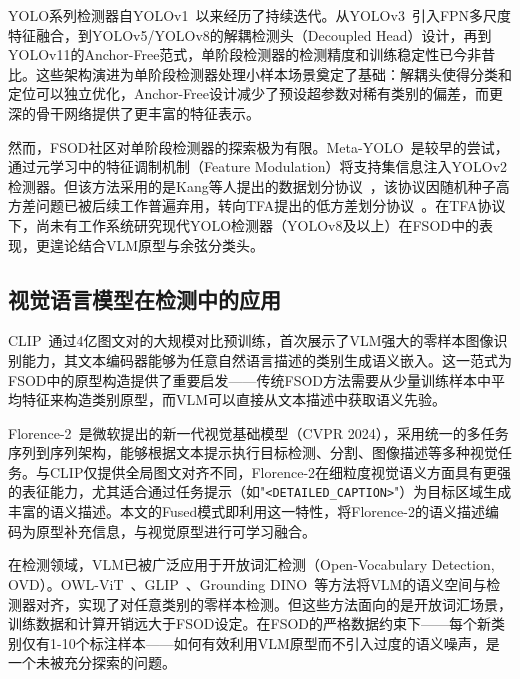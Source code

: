 \documentclass[zihao=5,a4paper,twocolumn]{ctexart}
\begin{document}
YOLO系列检测器自YOLOv1~\cite{redmon2016yolo}以来经历了持续迭代。从YOLOv3~\cite{redmon2018yolov3}引入FPN多尺度特征融合，到YOLOv5/YOLOv8的解耦检测头（Decoupled Head）设计，再到YOLOv11的Anchor-Free范式，单阶段检测器的检测精度和训练稳定性已今非昔比。这些架构演进为单阶段检测器处理小样本场景奠定了基础：解耦头使得分类和定位可以独立优化，Anchor-Free设计减少了预设超参数对稀有类别的偏差，而更深的骨干网络提供了更丰富的特征表示。

然而，FSOD社区对单阶段检测器的探索极为有限。Meta-YOLO~\cite{kang2019fsrw}是较早的尝试，通过元学习中的特征调制机制（Feature Modulation）将支持集信息注入YOLOv2检测器。但该方法采用的是Kang等人提出的数据划分协议~\cite{kang2019fsrw}，该协议因随机种子高方差问题已被后续工作普遍弃用，转向TFA提出的低方差划分协议~\cite{wang2020tfa}。在TFA协议下，尚未有工作系统研究现代YOLO检测器（YOLOv8及以上）在FSOD中的表现，更遑论结合VLM原型与余弦分类头。

\subsection{视觉语言模型在检测中的应用}

CLIP~\cite{radford2021clip}通过4亿图文对的大规模对比预训练，首次展示了VLM强大的零样本图像识别能力，其文本编码器能够为任意自然语言描述的类别生成语义嵌入。这一范式为FSOD中的原型构造提供了重要启发——传统FSOD方法需要从少量训练样本中平均特征来构造类别原型，而VLM可以直接从文本描述中获取语义先验。

Florence-2~\cite{xiao2024florence2}是微软提出的新一代视觉基础模型（CVPR 2024），采用统一的多任务序列到序列架构，能够根据文本提示执行目标检测、分割、图像描述等多种视觉任务。与CLIP仅提供全局图文对齐不同，Florence-2在细粒度视觉语义方面具有更强的表征能力，尤其适合通过任务提示（如"\texttt{<DETAILED\_CAPTION>}"）为目标区域生成丰富的语义描述。本文的Fused模式即利用这一特性，将Florence-2的语义描述编码为原型补充信息，与视觉原型进行可学习融合。

在检测领域，VLM已被广泛应用于开放词汇检测（Open-Vocabulary Detection, OVD）。OWL-ViT~\cite{minderer2022owlvit}、GLIP~\cite{li2022glip}、Grounding DINO~\cite{liu2023groundingdino}等方法将VLM的语义空间与检测器对齐，实现了对任意类别的零样本检测。但这些方法面向的是开放词汇场景，训练数据和计算开销远大于FSOD设定。在FSOD的严格数据约束下——每个新类别仅有1-10个标注样本——如何有效利用VLM原型而不引入过度的语义噪声，是一个未被充分探索的问题。

\end{document}
